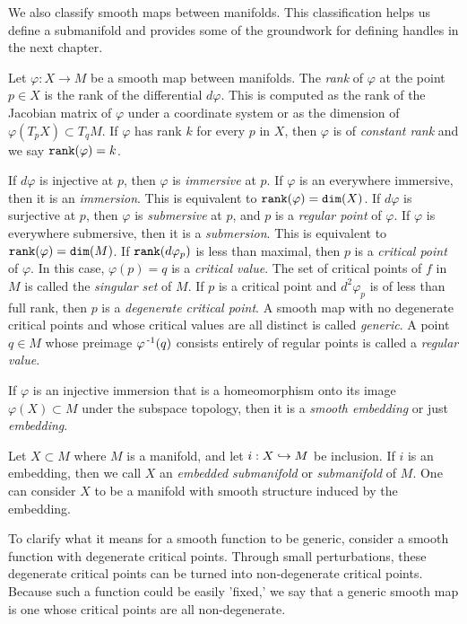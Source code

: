 We also classify smooth maps between manifolds.
This classification helps us define a submanifold and provides some of the groundwork for defining handles in the next chapter.

\begin{defn}[Embedding]
	Let $\varphi:X\to M$ be a smooth map between manifolds.
	The \emph{rank} of $\varphi$ at the point $p\in X$ is the rank of the differential $d\varphi$.
	This is computed as the rank of the Jacobian matrix of $\varphi$ under a coordinate system or as the dimension of $\varphi(T_p X)\subset T_q M$.
	If $\varphi$ has rank $k$ for every $p$ in $X$, then $\varphi$ is of \emph{constant rank} and we say $\texttt{rank}(\varphi)=k$.
	 
	If $d\varphi$ is injective at $p$, then $\varphi$ is \emph{immersive} at $p$.
	If $\varphi$ is an everywhere immersive, then it is an \emph{immersion}.
	This is equivalent to $\texttt{rank}(\varphi)=\texttt{dim}(X)$.
	If $d\varphi$ is surjective at $p$, then $\varphi$ is \emph{submersive} at $p$, and $p$ is a \emph{regular point} of $\varphi$.
	If $\varphi$ is everywhere submersive, then it is a \emph{submersion}.
	This is equivalent to $\texttt{rank}(\varphi)=\texttt{dim}(M)$.
	If $\texttt{rank}(d\varphi_p)$ is less than maximal, then $p$ is a \emph{critical point} of $\varphi$.
	In this case, $\varphi(p)=q$ is a \emph{critical value}.
	The set of critical points of $f$ in $M$ is called the \emph{singular set} of $M$.
	If $p$ is a critical point and $d^2\varphi_p$ is of less than full rank, then $p$ is a \emph{degenerate critical point}.
	A smooth map with no degenerate critical points and whose critical values are all distinct is called \emph{generic}.
	A point $q\in M$ whose preimage $\varphi^{\,\text{-}1}(q)$ consists entirely of regular points is called a \emph{regular value}.
	
	If $\varphi$ is an injective immersion that is a homeomorphism onto its image $\varphi(X)\subset M$ under the subspace topology, then it is a \emph{smooth embedding} or just \emph{embedding}.
	
	Let $X\subset M$ where $M$ is a manifold, and let $i:X\hookrightarrow M$ be inclusion.
	If $i$ is an embedding, then we call $X$ an \emph{embedded submanifold} or \emph{submanifold} of $M$.
	One can consider $X$ to be a manifold with smooth structure induced by the embedding.
\end{defn}

To clarify what it means for a smooth function to be generic, consider a smooth function with degenerate critical points.
Through small perturbations, these degenerate critical points can be turned into non-degenerate critical points.
Because such a function could be easily 'fixed,' we say that a generic smooth map is one whose critical points are all non-degenerate.

